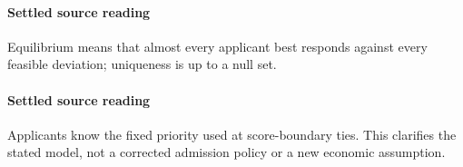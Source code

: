 \documentclass[10pt]{article}
\begin{document}
\paragraph{Settled source reading}
\begin{sloppypar}
Equilibrium means that almost every applicant best responds against every feasible deviation;\allowbreak{} uniqueness is up to a null set.\allowbreak{}
\end{sloppypar}
\paragraph{Settled source reading}
\begin{sloppypar}
Applicants know the fixed priority used at score-\allowbreak{}boundary ties.\allowbreak{} This clarifies the stated model, not a corrected admission policy or a new economic assumption.\allowbreak{}
\end{sloppypar}
\end{document}
